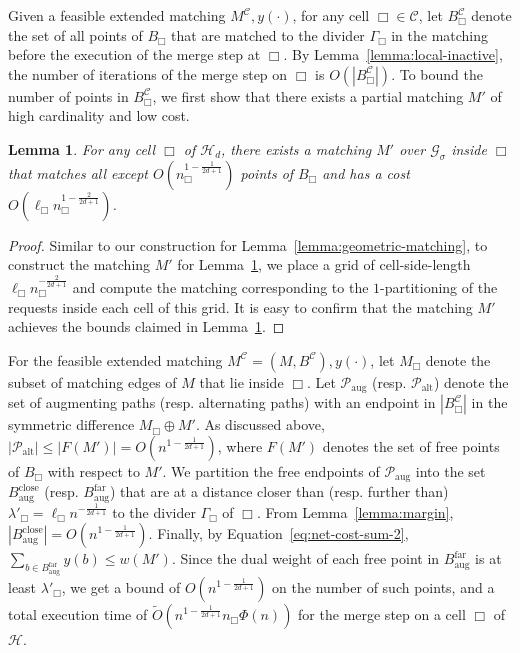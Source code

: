 \documentclass[11pt,onecolumn]{article}
\def\mcC{{\mathcal{C}}}
\def\mcG{{\mathcal{G}}}
\def\mcH{{\mathcal{H}}}
\def\mcP{{\mathcal{P}}}
\newcommand{\cell}{\Box}
\newcommand{\divider}[1]{\Gamma_{#1}}
\newtheorem{lemma}{Lemma}[section]
\begin{document}
Given a feasible extended matching $M^\mcC, y(\cdot)$, for any cell $\cell\in \mcC$, let $B^\mcC_\cell$ denote the set of all points of $B_\cell$ that are matched to the divider $\divider\cell$ in the matching before the execution of the merge step at $\cell$. By Lemma~\ref{lemma:local-inactive}, the number of iterations of the merge step on $\cell$ is $O(|B^\mcC_\cell|)$.
To bound the number of points in $B^\mcC_\cell$, we first show that there exists a partial matching $M'$ of high cardinality and low cost. 
\begin{lemma}\label{lemma:geometric-matching-d}
    For any cell $\cell$ of $\mcH_d$, there exists a matching $M'$ over $\mcG_\sigma$ inside $\cell$ that matches all except $O(n_\cell^{1-\frac{1}{2d+1}})$ points of $B_\cell$ and has a cost $O(\ell_\cell n_\cell^{1-\frac{2}{2d+1}})$.
\end{lemma}
\begin{proof}
    Similar to our construction for Lemma~\ref{lemma:geometric-matching}, to construct the matching $M'$ for Lemma~\ref{lemma:geometric-matching-d}, we place a grid of cell-side-length $\ell_\cell n_\cell^{-\frac{2}{2d+1}}$ and compute the matching corresponding to the $1$-partitioning of the requests inside each cell of this grid. It is easy to confirm that the matching $M'$ achieves the bounds claimed in Lemma~\ref{lemma:geometric-matching-d}.
\end{proof}


For the feasible extended matching $M^\mcC=(M, B^\mcC), y(\cdot)$, let $M_\cell$ denote the subset of matching edges of $M$ that lie inside $\cell$. 
Let $\mcP_{\mathrm{aug}}$ (resp. $\mcP_{\mathrm{alt}}$) denote the set of augmenting paths (resp. alternating paths) with an endpoint in $|B^\mcC_\cell|$ in the symmetric difference $M_\cell\oplus M'$.
As discussed above, $|\mcP_{\mathrm{alt}}|\le |F(M')|=O(n^{1-\frac{1}{2d+1}})$, where $F(M')$ denotes the set of free points of $B_\cell$ with respect to $M'$. 
We partition the free endpoints of $\mcP_{\mathrm{aug}}$ into the set $B^{\mathrm{close}}_{\mathrm{aug}}$ (resp. $B^{\mathrm{far}}_{\mathrm{aug}}$) that are at a distance closer than (resp. further than) $\lambda'_\cell=\ell_\cell n^{-\frac{1}{2d+1}}$ to the divider $\divider\cell$ of $\cell$. From Lemma~\ref{lemma:margin},  $|B^{\mathrm{close}}_{\mathrm{aug}}|=O(n^{1-\frac{1}{2d+1}})$. Finally, by Equation~\eqref{eq:net-cost-sum-2}, $\sum_{b\in B^{\mathrm{far}}_{\mathrm{aug}}}y(b) \le w(M')$. Since the dual weight of each free point in $B^{\mathrm{far}}_{\mathrm{aug}}$ is at least $\lambda'_\cell$, we get a bound of $O(n^{1-\frac{1}{2d+1}})$ on the number of such points, and a total execution time of $\tilde{O}(n^{1-\frac{1}{2d+1}}n_\cell\Phi(n))$ for the merge step on a cell $\cell$ of $\mcH$.
\end{document}
